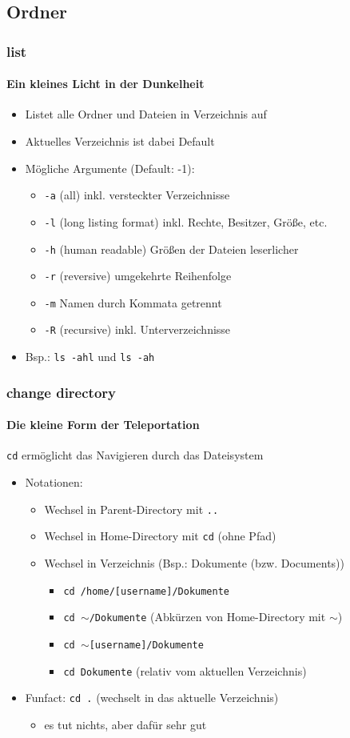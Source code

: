 \documentclass[12pt,utf8]{beamer}
\begin{document}
\subsection{Ordner}
\begin{frame}
\frametitle{list}
\framesubtitle{Ein kleines Licht in der Dunkelheit}
\begin{itemize}
	\item Listet alle Ordner und Dateien in Verzeichnis auf
	\item Aktuelles Verzeichnis ist dabei Default
	\item Mögliche Argumente (Default: -1):
	\begin{itemize}[<+->]
		\item \texttt{-a}  (all) inkl. versteckter Verzeichnisse
		\item \texttt{-l}  (long listing format) inkl. Rechte, Besitzer, Größe, etc.
		\item \texttt{-h}  (human readable) Größen der Dateien leserlicher
		\item \texttt{-r}  (reversive) umgekehrte Reihenfolge
		\item \texttt{-m}  Namen durch Kommata getrennt
		\item \texttt{-R}  (recursive) inkl. Unterverzeichnisse
	\end{itemize}
	\item Bsp.: \texttt{ls -ahl} und \texttt{ls -ah}
\end{itemize}
\end{frame}

\begin{frame}
\frametitle{change directory}
\framesubtitle{Die kleine Form der Teleportation}
\texttt{cd} ermöglicht das Navigieren durch das Dateisystem
\begin{itemize}
	\item Notationen:	
	\begin{itemize}[<+->]
		\item Wechsel in Parent-Directory mit \texttt{..}
		\item Wechsel in Home-Directory mit \texttt{cd}   (ohne Pfad)
		\item Wechsel in Verzeichnis (Bsp.: Dokumente (bzw. Documents))
		\begin{itemize}[<+->]
			\item \texttt{cd /home/[username]/Dokumente}
			\item \texttt{cd $\sim$/Dokumente}   (Abkürzen von Home-Directory mit $\sim$)
			\item \texttt{cd $\sim$[username]/Dokumente}
			\item \texttt{cd Dokumente}    (relativ vom aktuellen Verzeichnis)
		\end{itemize}
	\end{itemize}
	\item Funfact: \texttt{cd .}  (wechselt in das aktuelle Verzeichnis)
	\begin{itemize}
		\item es tut nichts, aber dafür sehr gut
	\end{itemize}
\end{itemize}
\end{frame}
\end{document}
